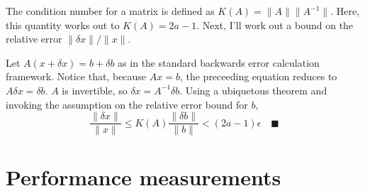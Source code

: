 \documentclass[12pt,fleqn,leqno,letterpaper]{article}
\begin{document}
The condition number for a matrix is defined as $K(A) = \|A\| \|A^{-1}\|$. Here,
this quantity works out to $K(A)=2a-1$. Next, I'll work out a bound on the
relative error $\|\delta x\|/\|x\|$.

Let $A(x + \delta x) = b + \delta b$ as in the standard backwards error
calculation framework. Notice that, because $Ax=b$, the preceeding equation
reduces to $A\delta x = \delta b$. $A$ is invertible, so
$\delta x = A^{-1}\delta b$. Using a ubiquetous theorem and invoking the
assumption on the relative error bound for $b$,
$$
\frac{\|\delta x\|}{\|x\|} \le K(A) \frac{\|\delta b\|}{\|b\|} < (2a-1)\epsilon
\quad\blacksquare
$$

\section{Performance measurements}
\end{document}
